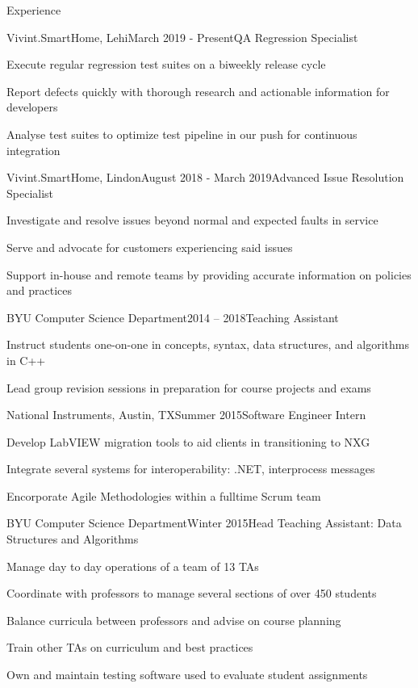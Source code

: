 \documentclass{resume} %
\begin{document}
\begin{rSection}{Experience}

\begin{rSubsection}{Vivint.SmartHome, Lehi}{March 2019 - Present}{QA Regression Specialist}{}
  \item Execute regular regression test suites on a biweekly release cycle
  \item Report defects quickly with thorough research and actionable information for developers
  \item Analyse test suites to optimize test pipeline in our push for continuous integration
\end{rSubsection}

\begin{rSubsection}{Vivint.SmartHome, Lindon}{August 2018 - March 2019}{Advanced Issue Resolution Specialist}{}
  \item Investigate and resolve issues beyond normal and expected faults in service
  \item Serve and advocate for customers experiencing said issues
  \item Support in-house and remote teams by providing accurate information on policies and practices
\end{rSubsection}

\begin{rSubsection}{BYU Computer Science Department}{2014 – 2018}{Teaching Assistant}{}
  \item Instruct students one-on-one in concepts, syntax, data structures, and algorithms in C++
  \item Lead group revision sessions in preparation for course projects and exams
\end{rSubsection}

\begin{rSubsection}{National Instruments, Austin, TX}{Summer 2015}{Software Engineer Intern}{}
  \item Develop LabVIEW migration tools to aid clients in transitioning to NXG
  \item Integrate several systems for interoperability: .NET, interprocess messages
  \item Encorporate Agile Methodologies within a fulltime Scrum team
\end{rSubsection}

\begin{rSubsection}{BYU Computer Science Department}{Winter 2015}{Head Teaching Assistant: Data Structures and Algorithms}{}
  \item Manage day to day operations of a team of 13 TAs
  \item Coordinate with professors to manage several sections of over 450 students
  \item Balance curricula between professors and advise on course planning
  \item Train other TAs on curriculum and best practices
  \item Own and maintain testing software used to evaluate student assignments
\end{rSubsection}

\end{rSection}
\end{document}
